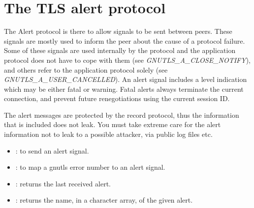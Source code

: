 \section{The TLS alert protocol}
\label{alert}

The Alert protocol
is there to allow signals to be sent between peers.
These signals are mostly used to inform the peer about the cause of
a protocol failure. Some of these signals are used internally by the
protocol and the application protocol does not have to cope with them
(see \emph{GNUTLS\_A\_CLOSE\_NOTIFY}), and others refer to the
application protocol solely (see \emph{GNUTLS\_A\_USER\_CANCELLED}).
An alert signal includes a level indication which may be either
fatal or warning. Fatal alerts always terminate the current connection,
and prevent future renegotiations using the current session ID.

\par The alert messages are protected by the record protocol, thus
the information that is included does not leak. You must take
extreme care for the alert information not to leak to a possible attacker, 
via public log files etc.

\par
\begin{itemize}
\item {}:
to send an alert signal.
\item {}:
to map a gnutls error number to an alert signal.
\item {}:
returns the last received alert.
\item {}:
returns the name, in a character array, of the given alert.
\end{itemize}

